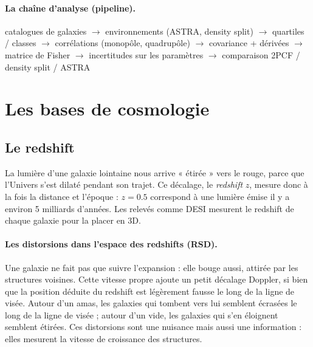 \documentclass[11pt]{article}
\begin{document}
\paragraph{La chaîne d'analyse (pipeline).}
\begin{center}
\small
catalogues de galaxies $\to$ environnements (ASTRA, density split) $\to$ quartiles / classes $\to$ corrélations (monopôle, quadrupôle) $\to$ covariance + dérivées $\to$ matrice de Fisher $\to$ incertitudes sur les paramètres $\to$ comparaison 2PCF / density split / ASTRA
\end{center}

\section{Les bases de cosmologie}

\subsection{Le redshift}
La lumière d'une galaxie lointaine nous arrive « étirée » vers le rouge, parce que l'Univers s'est dilaté pendant son trajet. Ce décalage, le \emph{redshift} $z$, mesure donc à la fois la distance et l'époque : $z=0.5$ correspond à une lumière émise il y a environ 5 milliards d'années. Les relevés comme DESI mesurent le redshift de chaque galaxie pour la placer en 3D.

\paragraph{Les distorsions dans l'espace des redshifts (RSD).} Une galaxie ne fait pas que suivre l'expansion : elle bouge aussi, attirée par les structures voisines. Cette vitesse propre ajoute un petit décalage Doppler, si bien que la position déduite du redshift est légèrement fausse le long de la ligne de visée. Autour d'un amas, les galaxies qui tombent vers lui semblent écrasées le long de la ligne de visée ; autour d'un vide, les galaxies qui s'en éloignent semblent étirées. Ces distorsions sont une nuisance mais aussi une information : elles mesurent la vitesse de croissance des structures.
\end{document}
